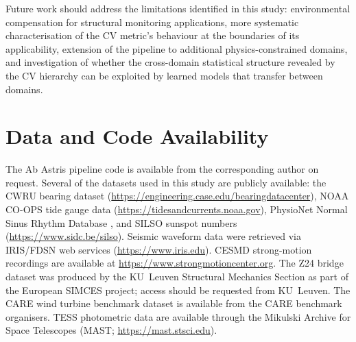 \documentclass[11pt,a4paper]{article}
\begin{document}
Future work should address the limitations identified in this study: environmental compensation for structural monitoring applications, more systematic characterisation of the CV metric's behaviour at the boundaries of its applicability, extension of the pipeline to additional physics-constrained domains, and investigation of whether the cross-domain statistical structure revealed by the CV hierarchy can be exploited by learned models that transfer between domains.


\section*{Data and Code Availability}

The Ab Astris pipeline code is available from the corresponding author on request. Several of the datasets used in this study are publicly available: the CWRU bearing dataset (\url{https://engineering.case.edu/bearingdatacenter}), NOAA CO-OPS tide gauge data (\url{https://tidesandcurrents.noaa.gov}), PhysioNet Normal Sinus Rhythm Database \citep{Goldberger2000}, and SILSO sunspot numbers (\url{https://www.sidc.be/silso}). Seismic waveform data were retrieved via IRIS/FDSN web services (\url{https://www.iris.edu}). CESMD strong-motion recordings are available at \url{https://www.strongmotioncenter.org}. The Z24 bridge dataset was produced by the KU~Leuven Structural Mechanics Section as part of the European SIMCES project; access should be requested from KU~Leuven. The CARE wind turbine benchmark dataset is available from the CARE benchmark organisers. TESS photometric data are available through the Mikulski Archive for Space Telescopes (MAST; \url{https://mast.stsci.edu}).



\end{document}
